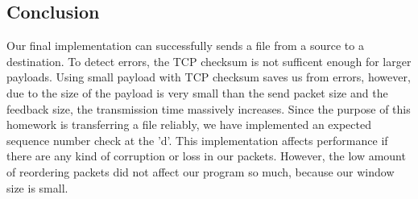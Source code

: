 \documentclass[12pt,journal,compsoc]{IEEEtran}
\begin{document}
\subsection{Conclusion}
Our final implementation can successfully sends a file from a source to a destination. To detect errors, the TCP checksum is not sufficent enough for larger payloads. Using small payload with TCP checksum saves us from errors, however, due to the size of the payload is very small than the send packet size and the feedback size, the transmission time massively increases. Since the purpose of this homework is transferring a file reliably, we have implemented an expected sequence number check at the 'd'. This implementation affects performance if there are any kind of corruption or loss in our packets. However, the low amount of reordering packets did not affect our program so much, because our window size is small.
\end{document}
